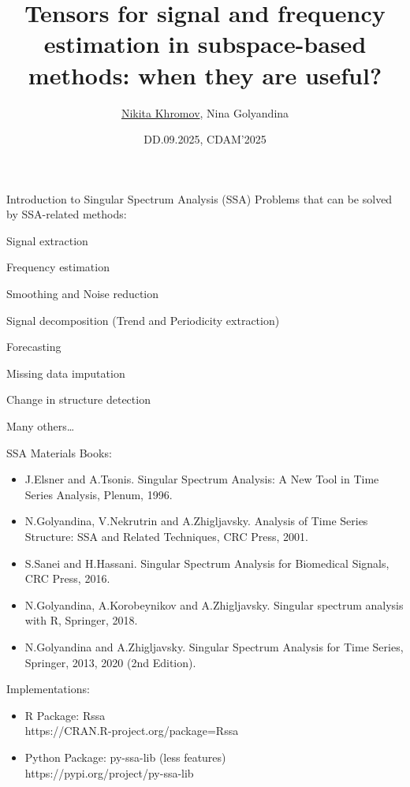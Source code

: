 \documentclass[pdf, unicode, ucs, notheorems]{beamer}
\title[Tensor SSA]{Tensors for signal and frequency estimation in
subspace-based methods: when they are useful?}
\author[Khromov N., Golyandina N.]{\texorpdfstring{\underline{Nikita
Khromov}}{Nikita Khromov}, Nina Golyandina}
\institute[SPbU]{%
  \small
  \vspace{0.2cm}\\
  St.\,Petersburg State University\\
  Department of Statistical Modeling\\
  \vspace{0.1cm}
}
\date{\small DD.09.2025, CDAM'2025}
\newcommand{\bluetext}[1]{{\usebeamercolor[fg]{bluetext_color}#1}}
\theoremstyle{definition}
\begin{document}
\begin{frame}[plain]
  \titlepage
\end{frame}

\begin{frame}{Introduction to Singular Spectrum Analysis (SSA)}
  Problems that can be solved by SSA-related methods:
  \begin{itemize}
      \bluetext{
      \item Signal extraction
      \item Frequency estimation
      }
    \item Smoothing and Noise reduction
    \item Signal decomposition (Trend and Periodicity extraction)
    \item Forecasting
    \item Missing data imputation
    \item Change in structure detection
    \item Many others\dots
  \end{itemize}

\end{frame}

\begin{frame}{SSA Materials}
  Books:
  \begin{itemize}
    \item J.Elsner and A.Tsonis. Singular Spectrum Analysis: A New Tool in
      Time Series Analysis, Plenum, 1996.
    \item N.Golyandina, V.Nekrutrin and A.Zhigljavsky. Analysis of Time
      Series Structure: SSA and Related Techniques, CRC Press, 2001.
    \item S.Sanei and H.Hassani. Singular Spectrum Analysis for Biomedical
      Signals, CRC Press, 2016.
    \item N.Golyandina, A.Korobeynikov and A.Zhigljavsky. Singular spectrum
      analysis with R, Springer, 2018.
    \item N.Golyandina and A.Zhigljavsky. Singular Spectrum Analysis for
      Time Series, Springer, 2013, 2020 (2nd Edition).
  \end{itemize}

  \bigskip

  Implementations:
  \begin{itemize}
    \item R Package: Rssa \\
      \hspace{2ex} https://CRAN.R-project.org/package=Rssa
    \item Python Package: py-ssa-lib (less features) \\
      \hspace{2ex} https://pypi.org/project/py-ssa-lib
  \end{itemize}
\end{frame}
\end{document}
